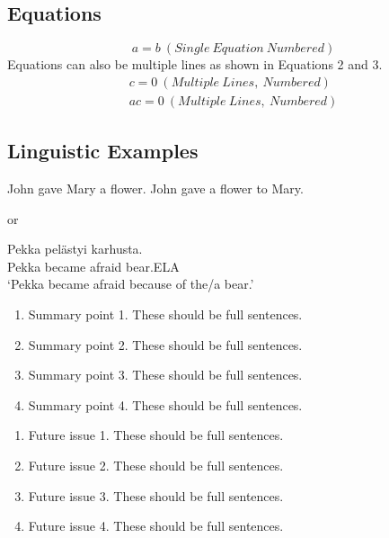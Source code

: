 \documentclass{ar-1col}
\begin{document}
\subsection{Equations}
\begin{equation}
a = b \ {(Single\ Equation\ Numbered)}
\end{equation}
Equations can also be multiple lines as shown in Equations 2 and 3.
\begin{eqnarray}
c = 0 \ {(Multiple\  Lines, \ Numbered)}\\
ac = 0 \ {(Multiple \ Lines, \ Numbered)}
\end{eqnarray}

\subsection{Linguistic Examples}
\begin{exe}
\label{Johna}      
John gave Mary a flower.
\label{Johnb} 
John gave a flower to Mary.
\end{exe}

or

\begin{exe}
\label{bear}     
\gll Pekka pel\"astyi karhusta.\\
Pekka {became afraid} bear.ELA\\
\trans `Pekka became afraid because of the/a bear.'
\end{exe}

\begin{summary}
\begin{enumerate}
\item Summary point 1. These should be full sentences.
\item Summary point 2. These should be full sentences.
\item Summary point 3. These should be full sentences.
\item Summary point 4. These should be full sentences.
\end{enumerate}
\end{summary}

\begin{issues}
\begin{enumerate}
\item Future issue 1. These should be full sentences.
\item Future issue 2. These should be full sentences.
\item Future issue 3. These should be full sentences.
\item Future issue 4. These should be full sentences.
\end{enumerate}
\end{issues}
\end{document}
